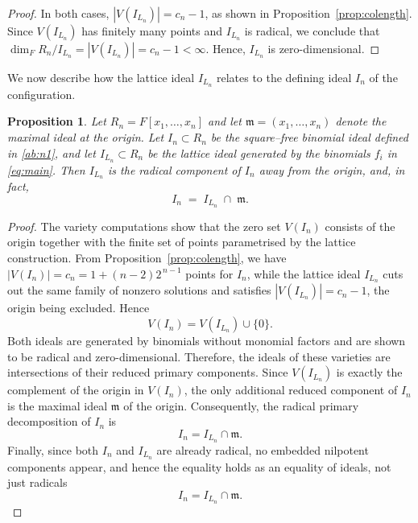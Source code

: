 \documentclass[11pt]{amsart}
\theoremstyle{plain}
\newtheorem{prop}[theorem]{Proposition}
\theoremstyle{definition}
\theoremstyle{remark}
\begin{document}
\begin{proof}
	In both cases, \( |V(I_{L_n})| = c_n -1 \), as shown in Proposition~\ref{prop:colength}. Since \( V(I_{L_n}) \) has finitely many points and \( I_{L_n} \) is radical, we conclude that \( \dim_F R_n / I_{L_n} = |V(I_{L_n})| = c_n -1 < \infty \). Hence, \( I_{L_n} \) is zero-dimensional.
	
\end{proof}

We now describe how the lattice ideal \( I_{L_n} \) relates to the defining ideal \( I_n \) of the configuration. 

\begin{prop}
	\label{prop:relation_In_ILn}
	Let \( R_n = F[x_1, \dots, x_n] \) and let \(  \mathfrak{m} = (x_1, \dots, x_n) \) denote the maximal ideal at the origin. 
	Let \( I_n \subset R_n \) be the square–free binomial ideal defined in \eqref{ab:n1}, and let \( I_{L_n} \subset R_n \) be the lattice ideal generated by the binomials \( f_i \) in \eqref{eq:main}. 
	Then \( I_{L_n} \) is the radical component of \( I_n \) away from the origin, and, in fact,\[
	I_n \;=\; I_{L_n} \;\cap\;  \mathfrak{m}.
	\]
\end{prop}

\begin{proof}
	The variety computations show that the zero set \( V(I_n) \) consists of the origin together with the finite set of points parametrised by the lattice construction. From Proposition~\ref{prop:colength}, we have \( |V(I_n)| = c_n = 1 + (n-2)2^{\,n-1} \) points for \( I_n \), while the lattice ideal \( I_{L_n} \) cuts out the same family of nonzero solutions and satisfies \( |V(I_{L_n})| = c_n - 1 \), the origin being excluded. 
	Hence
	\[
	V(I_n) = V(I_{L_n}) \cup \{0\}.
	\]
	Both ideals are generated by binomials without monomial factors and are shown to be radical and zero-dimensional. Therefore, the ideals of these varieties are intersections of their reduced primary components. 
	Since \( V(I_{L_n}) \) is exactly the complement of the origin in \( V(I_n) \), the only additional reduced component of \( I_n \) is the maximal ideal \( \mathfrak{m} \) of the origin. 
	Consequently, the radical primary decomposition of \( I_n \) is
	\[
	I_n = I_{L_n} \cap  \mathfrak{m}.
	\]
	Finally, since both \( I_n \) and \( I_{L_n} \) are already radical, no embedded nilpotent components appear, and hence the equality holds as an equality of ideals, not just radicals
	\[
	I_n = I_{L_n} \cap  \mathfrak{m}.
	\]
	
\end{proof}
\end{document}
